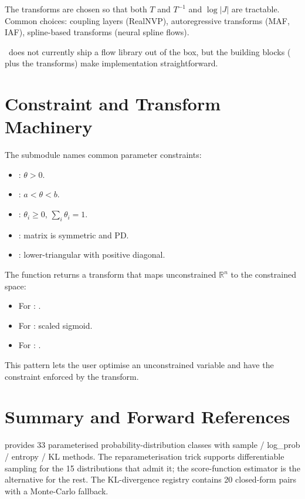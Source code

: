 The transforms are chosen so that both $T$ and $T^{-1}$ and
$\log |J|$ are tractable. Common choices: coupling layers (RealNVP),
autoregressive transforms (MAF, IAF), spline-based transforms
(neural spline flows).

\Lucid\ does not currently ship a flow library out of the box,
but the building blocks ( plus the
transforms) make implementation straightforward.

\section{Constraint and Transform Machinery}
\label{sec:distributions:constraints_detail}

The  submodule names common parameter
constraints:
\begin{itemize}
  \item {}: $\theta > 0$.
  \item {}: $a < \theta < b$.
  \item {}: $\theta_i \geq 0$, $\sum_i \theta_i = 1$.
  \item {}: matrix is symmetric and PD.
  \item {}: lower-triangular with positive
    diagonal.
\end{itemize}

The  function returns a transform
that maps unconstrained $\mathbb{R}^n$ to the constrained space:
\begin{itemize}
  \item For : .
  \item For : scaled sigmoid.
  \item For : .
\end{itemize}

This pattern lets the user optimise an unconstrained variable
and have the constraint enforced by the transform.

\section{Summary and Forward References}
\label{sec:distributions:summary}

 provides 33 parameterised
probability-distribution classes with sample / log\_prob / entropy
/ KL methods. The reparameterisation trick supports
differentiable sampling for the 15 distributions that admit it;
the score-function estimator is the alternative for the rest.
The KL-divergence registry contains 20 closed-form pairs with a
Monte-Carlo fallback.

